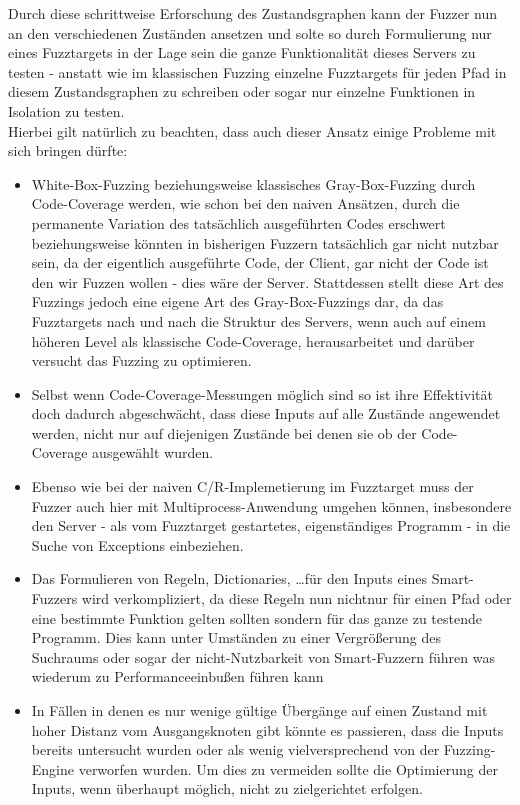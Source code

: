 \documentclass[a4paper]{article}
\begin{document}
Durch diese schrittweise Erforschung des Zustandsgraphen kann der Fuzzer nun an den verschiedenen Zuständen ansetzen und solte so durch Formulierung nur eines Fuzztargets in der Lage sein die ganze Funktionalität dieses Servers zu testen - anstatt wie im klassischen Fuzzing einzelne Fuzztargets für jeden Pfad in diesem Zustandsgraphen zu schreiben oder sogar nur einzelne Funktionen in Isolation zu testen.\\
Hierbei gilt natürlich zu beachten, dass auch dieser Ansatz einige Probleme mit sich bringen dürfte:
\begin{itemize}
    \item White-Box-Fuzzing beziehungsweise klassisches Gray-Box-Fuzzing durch Code-Coverage werden, wie schon bei den naiven Ansätzen, durch die permanente Variation des tatsächlich ausgeführten Codes erschwert beziehungsweise könnten in bisherigen Fuzzern tatsächlich gar nicht nutzbar sein, da der eigentlich ausgeführte Code, der Client, gar nicht der Code ist den wir Fuzzen wollen - dies wäre der Server. Stattdessen stellt diese Art des Fuzzings jedoch eine eigene Art des Gray-Box-Fuzzings dar, da das Fuzztargets nach und nach die Struktur des Servers, wenn auch auf einem höheren Level als klassische Code-Coverage, herausarbeitet und darüber versucht das Fuzzing zu optimieren.
    \item Selbst wenn Code-Coverage-Messungen möglich sind so ist ihre Effektivität doch dadurch abgeschwächt, dass diese Inputs auf alle Zustände angewendet werden, nicht nur auf diejenigen Zustände bei denen sie ob der Code-Coverage ausgewählt wurden. 
    \item Ebenso wie bei der naiven C/R-Implemetierung im Fuzztarget muss der Fuzzer auch hier mit Multiprocess-Anwendung umgehen können, insbesondere den Server - als vom Fuzztarget gestartetes, eigenständiges Programm - in die Suche von Exceptions einbeziehen.
    \item Das Formulieren von Regeln, Dictionaries, \dots für den Inputs eines Smart-Fuzzers wird verkompliziert, da diese Regeln nun nichtnur für einen Pfad oder eine bestimmte Funktion gelten sollten sondern für das ganze zu testende Programm. 
        Dies kann unter Umständen zu einer Vergrößerung des Suchraums oder sogar der nicht-Nutzbarkeit von Smart-Fuzzern führen was wiederum zu Performanceeinbußen führen kann
    \item In Fällen in denen es nur wenige gültige Übergänge auf einen Zustand mit hoher Distanz vom Ausgangsknoten gibt könnte es passieren, dass die Inputs bereits untersucht wurden oder als wenig vielversprechend von der Fuzzing-Engine verworfen wurden. Um dies zu vermeiden sollte die Optimierung der Inputs, wenn überhaupt möglich, nicht zu zielgerichtet erfolgen.
    
\end{itemize}
\end{document}
